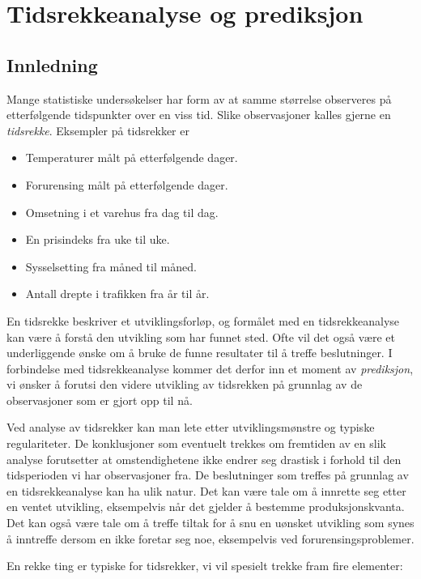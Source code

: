 \chapter{Tidsrekkeanalyse og prediksjon}
\label{kap:tidsrekkeanalyse} %

\section{Innledning}

Mange statistiske undersøkelser har form av at samme størrelse
observeres på etterfølgende tidspunkter over en viss tid.  Slike
observasjoner kalles gjerne en {\em tidsrekke}.  Eksempler på tidsrekker
er 
\begin{itemize}
\item  Temperaturer målt på etterfølgende dager.
\item  Forurensing målt på etterfølgende dager.
\item  Omsetning i et varehus fra dag til dag.
\item  En prisindeks fra uke til uke.
\item  Sysselsetting fra måned til måned.
\item  Antall drepte i trafikken fra år til år.
\end{itemize}

En tidsrekke beskriver et utviklingsforløp, og formålet med en 
tidsrekkeanalyse kan være å forstå den utvikling som har funnet
sted.  Ofte vil det også være et underliggende ønske om å
bruke de funne resultater til å treffe beslutninger.  I forbindelse med
tidsrekkeanalyse kommer det derfor inn et moment av {\em prediksjon}, vi
ønsker å forutsi den videre utvikling av tidsrekken på grunnlag
av de observasjoner som er gjort opp til nå.

Ved analyse av tidsrekker kan man lete etter utviklingsmønstre og
typiske regulariteter.  De konklusjoner som eventuelt trekkes om fremtiden
av en slik analyse forutsetter at omstendighetene ikke
endrer seg drastisk i forhold til den tidsperioden vi har observasjoner fra.  
De beslutninger som treffes på grunnlag av en tidsrekkeanalyse kan ha
ulik natur.  Det kan være tale om å innrette seg etter en ventet
utvikling, eksempelvis når det gjelder å bestemme 
produksjonskvanta.  Det kan også være tale om å treffe tiltak for
å snu en uønsket utvikling som synes å inntreffe dersom en ikke
foretar seg noe, eksempelvis ved forurensingsproblemer.

En rekke ting er typiske for tidsrekker, vi vil spesielt trekke fram fire
elementer:

